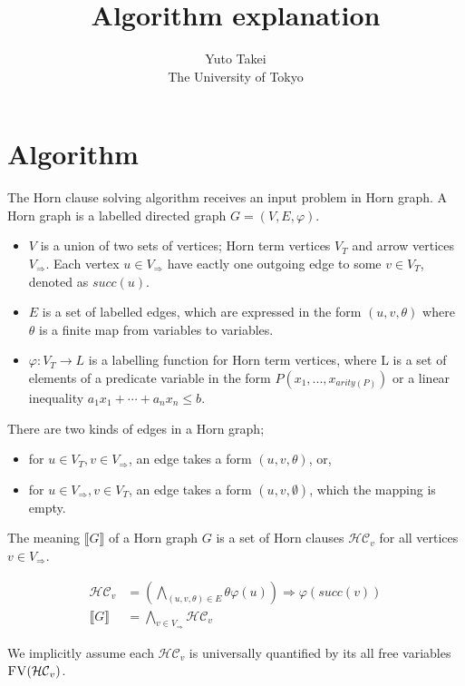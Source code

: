 \documentclass[a4paper,12pt]{article}
\title{Algorithm explanation}
\author{Yuto Takei \\ The University of Tokyo}
\begin{document}
\maketitle

\section{Algorithm}

The Horn clause solving algorithm receives an input problem in Horn
graph. A Horn graph is a labelled directed graph $G=(V,E,\varphi)$.
\begin{itemize}
\item $V$ is a union of two sets of vertices; Horn term vertices $V_T$
  and arrow vertices $V_\Rightarrow$. Each vertex $u \in
  V_\Rightarrow$ have eactly one outgoing edge to some $v \in V_T$,
  denoted as $succ(u)$.
\item $E$ is a set of labelled edges, which are expressed in the form
  $(u,v,\theta)$ where $\theta$ is a finite map from variables to
  variables.
\item $\varphi: V_T \rightarrow L$ is a labelling function for Horn
  term vertices, where L is a set of elements of a predicate variable
  in the form $P(x_1, ..., x_{arity(P)})$ or a linear inequality $a_1
  x_1 + \cdots + a_n x_n \leq b$.
\end{itemize}

There are two kinds of edges in a Horn graph;
\begin{itemize}
\item for $u \in V_T, v \in V_\Rightarrow$, an edge takes a form
  $(u,v,\theta)$, or,
\item for $u \in V_\Rightarrow, v \in V_T$, an edge takes a form
  $(u,v,\emptyset)$, which the mapping is empty.
\end{itemize}

The meaning $\llbracket G \rrbracket $ of a Horn graph $G$ is a set of
Horn clauses $\mathcal{HC}_v$ for all vertices $v \in V_\Rightarrow$.

\begin{align*}
\mathcal{HC}_v & = \left( \bigwedge_{(u,v,\theta) \in E} \theta \varphi(u) \right) \Longrightarrow \varphi(succ(v)) \\
\llbracket G \rrbracket & = \bigwedge_{v \in V_\Rightarrow} \mathcal{HC}_v
\end{align*}

We implicitly assume each $\mathcal{HC}_v$ is universally quantified
by its all free variables $\textsc{FV}(\mathcal{HC}_v)$.
\end{document}
